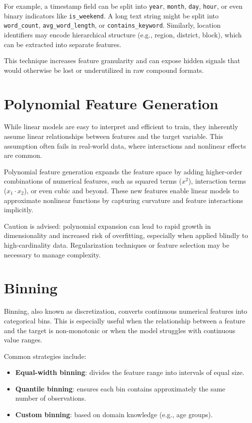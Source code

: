 \documentclass[12pt,openany]{book}
\begin{document}
For example, a timestamp field can be split into \texttt{year}, \texttt{month}, \texttt{day}, \texttt{hour}, or even binary indicators like \texttt{is\_weekend}. A long text string might be split into \texttt{word\_count}, \texttt{avg\_word\_length}, or \texttt{contains\_keyword}. Similarly, location identifiers may encode hierarchical structure (e.g., region, district, block), which can be extracted into separate features.

This technique increases feature granularity and can expose hidden signals that would otherwise be lost or underutilized in raw compound formats.



\section{Polynomial Feature Generation}

While linear models are easy to interpret and efficient to train, they inherently assume linear relationships between features and the target variable. This assumption often fails in real-world data, where interactions and nonlinear effects are common.

Polynomial feature generation expands the feature space by adding higher-order combinations of numerical features, such as squared terms (\(x^2\)), interaction terms (\(x_1 \cdot x_2\)), or even cubic and beyond. These new features enable linear models to approximate nonlinear functions by capturing curvature and feature interactions implicitly.

Caution is advised: polynomial expansion can lead to rapid growth in dimensionality and increased risk of overfitting, especially when applied blindly to high-cardinality data. Regularization techniques or feature selection may be necessary to manage complexity.



\section{Binning}

Binning, also known as discretization, converts continuous numerical features into categorical bins. This is especially useful when the relationship between a feature and the target is non-monotonic or when the model struggles with continuous value ranges.

Common strategies include:
\begin{itemize}
    \item \textbf{Equal-width binning}: divides the feature range into intervals of equal size.
    \item \textbf{Quantile binning}: ensures each bin contains approximately the same number of observations.
    \item \textbf{Custom binning}: based on domain knowledge (e.g., age groups).
\end{itemize}
\end{document}
